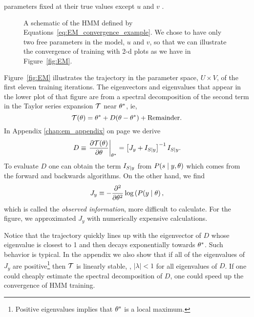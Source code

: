 parameters fixed at their true values except $u$ and $v$ .
\begin{figure}[htbp]
  \caption[An HMM with only two parameters.]%
  {A schematic of the HMM defined by
    Equations~\eqref{eq:EM_convergence_example}.  We chose to have only two
    free parameters in the model, $u$ and $v$, so that we can
    illustrate the convergence of training with 2-d plots as we have
    in Figure~\ref{fig:EM}.}
  \label{fig:EMxfig}
\end{figure}
      
Figure~\ref{fig:EM} illustrates the trajectory in the parameter space,
$U \times V$, of the first eleven training iterations.  The
eigenvectors and eigenvalues that appear in the lower plot of that
figure are from a spectral decomposition of the second term in the
Taylor series expansion $\EMmap$ near ${\theta^*}$, ie,
\begin{equation*}
  \EMmap(\parameters) = \EMfixedPoint + D  (\parameters - \EMfixedPoint) +
             \text{Remainder.}
\end{equation*}
In Appendix \ref{chap:em_appendix} on page
\pageref{eq:information_em_derivative} we derive
\begin{equation*}
  D \equiv \left.\frac{\partial \EMmap(\parameters)}{\partial \parameters}
  \right|_\EMfixedPoint = \left[J_y + I_{S|y}  \right]^{-1} I_{S|y}.
\end{equation*}
To evaluate $D$ one can obtain the term $I_{S\mid y}$ from
$P(s\mid y, \theta)$ which comes from the forward and backwards
algorithms.  On the other hand, we find
\begin{equation*}
  J_y \equiv -\frac{\partial^2}{\partial \theta^2} \log \left( P(y \mid
    \theta \right),
\end{equation*}
which is called the \emph{observed information}, more difficult to
calculate.  For the figure, we approximated $J_y$ with numerically
expensive calculations.

Notice that the trajectory quickly lines up with the eigenvector of
$D$ whose eigenvalue is closest to 1 and then decays exponentially
towards ${\theta^*}$.  Such behavior is typical.  In the appendix
we also show that if all of the eigenvalues of $J_y$ are
positive\footnote{Positive eigenvalues implies that ${\theta^*}$ is
  a local maximum.} then $\EMmap$ is linearly stable, \ie,
$\left| \lambda \right| < 1$ for all eigenvalues of $D$.  If one could
cheaply estimate the spectral decomposition of $D$, one could speed up
the convergence of HMM training.

